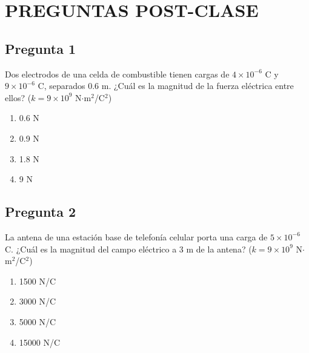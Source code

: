 
\renewcommand{\tema}{Preguntas Post-Clase — Electromagnetismo}

\twocolumn
\section{PREGUNTAS POST-CLASE}


\begin{preguntabox}
\subsection{Pregunta 1}
Dos electrodos de una celda de combustible tienen cargas de $4 \times 10^{-6}$ C y $9 \times 10^{-6}$ C, separados 0.6 m. ¿Cuál es la magnitud de la fuerza eléctrica entre ellos? ($k = 9 \times 10^9$ N$\cdot$m$^2$/C$^2$)

\begin{enumerate}
    \item[A)] 0.6 N
    \item[B)] 0.9 N
    \item[C)] 1.8 N
    \item[D)] 9 N
\end{enumerate}
\end{preguntabox}

\begin{preguntabox}
\subsection{Pregunta 2}
La antena de una estación base de telefonía celular porta una carga de $5 \times 10^{-6}$ C. ¿Cuál es la magnitud del campo eléctrico a 3 m de la antena? ($k = 9 \times 10^9$ N$\cdot$m$^2$/C$^2$)

\begin{enumerate}
    \item[A)] 1500 N/C
    \item[B)] 3000 N/C
    \item[C)] 5000 N/C
    \item[D)] 15000 N/C
\end{enumerate}
\end{preguntabox}

